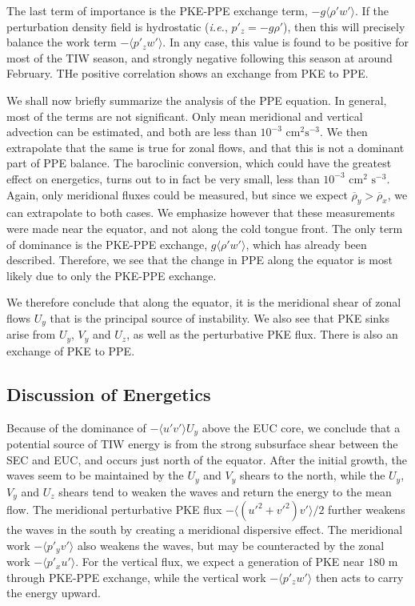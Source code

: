 \documentclass[letterpaper, 11pt, onecolumn]{article}
\begin{document}
The last term of importance is the PKE-PPE exchange term, $-g \langle \rho' w'
\rangle$. If the perturbation density field is hydrostatic (\emph{i.e.}, $p'_z
= - g \rho'$), then this will precisely balance the work term $-\langle p'_z w'
\rangle$. In any case, this value is found to be positive for most of the TIW
season, and strongly negative following this season at around February. THe 
positive correlation shows an exchange from PKE to PPE.

We shall now briefly summarize the analysis of the PPE equation. In general,
most of the terms are not significant. Only mean meridional and vertical
advection can be estimated, and both are less than $10^{-3} \text{ cm}^2 \text{
s}^{-3}$. We then extrapolate that the same is true for zonal flows, and that
this is not a dominant part of PPE balance. The baroclinic conversion, which
could have the greatest effect on energetics, turns out to in fact be very
small, less than $10^{-3} \text{ cm}^2 \text{ s}^{-3}$. Again, only meridional
fluxes could be measured, but since we expect $\overline{\rho}_y >
\overline{\rho}_x$, we can extrapolate to both cases. We emphasize however that
these measurements were made near the equator, and not along the cold tongue
front. The only term of dominance is the PKE-PPE exchange, $g \langle \rho' w'
\rangle$, which has already been described. Therefore, we see that the change
in PPE along the equator is most likely due to only the PKE-PPE exchange.

We therefore conclude that along the equator, it is the meridional shear of
zonal flows $U_y$ that is the principal source of instability. We also see that
PKE sinks arise from $U_y$, $V_y$ and $U_z$, as well as the perturbative PKE
flux. There is also an exchange of PKE to PPE.

\subsection{Discussion of Energetics}

Because of the dominance of $-\langle u' v' \rangle U_y$ above the EUC core, we
conclude that a potential source of TIW energy is from the strong subsurface
shear between the SEC and EUC, and occurs just north of the equator. After the
initial growth, the waves seem to be maintained by the $U_y$ and $V_y$ shears
to the north, while the $U_y$, $V_y$ and $U_z$ shears tend to weaken the waves
and return the energy to the mean flow. The meridional perturbative PKE flux
$-\langle \left(u'^2 + v'^2\right) v' \rangle / 2$ further weakens the waves in
the south by creating a meridional dispersive effect. The meridional work
$-\langle p'_y v' \rangle$ also weakens the waves, but may be counteracted by
the zonal work $-\langle p'_x u' \rangle$. For the vertical flux, we expect a
generation of PKE near $180 \text{ m}$ through PKE-PPE exchange, while the
vertical work $-\langle p'_z w' \rangle$ then acts to carry the energy upward.
\end{document}
